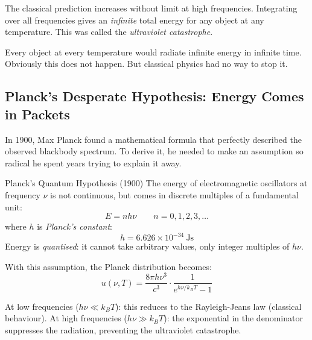 \documentclass[12pt, a4paper]{book}
\newcommand{\newterm}[1]{\textit{\textcolor{DiscoveryColor}{#1}}}
\begin{document}
\vspace{0.4em}

The classical prediction increases without limit at high
frequencies.
Integrating over all frequencies gives an \emph{infinite}
total energy for any object at any temperature.
This was called the \newterm{ultraviolet catastrophe}.

Every object at every temperature would radiate infinite
energy in infinite time.
Obviously this does not happen.
But classical physics had no way to stop it.

\subsection{Planck's Desperate Hypothesis: Energy Comes in Packets}

In 1900, Max Planck found a mathematical formula that perfectly
described the observed blackbody spectrum.
To derive it, he needed to make an assumption so radical
he spent years trying to explain it away.

\begin{namedconcept}{Planck's Quantum Hypothesis (1900)}
The energy of electromagnetic oscillators at frequency $\nu$
is not continuous, but comes in discrete multiples of
a fundamental unit:
\[
  E = n h\nu \qquad n = 0, 1, 2, 3, \ldots
\]
where $h$ is \newterm{Planck's constant}:
\[
  h = 6.626 \times 10^{-34}\ \si{\joule\second}
\]
Energy is \newterm{quantised}: it cannot take arbitrary values,
only integer multiples of $h\nu$.
\end{namedconcept}

\vspace{0.5em}

With this assumption, the Planck distribution becomes:
\[
  u(\nu, T) = \frac{8\pi h \nu^3}{c^3} \cdot
              \frac{1}{e^{h\nu/k_BT} - 1}
\]

At low frequencies ($h\nu \ll k_BT$):
this reduces to the Rayleigh-Jeans law (classical behaviour).
At high frequencies ($h\nu \gg k_BT$):
the exponential in the denominator suppresses the radiation,
preventing the ultraviolet catastrophe.
\end{document}
